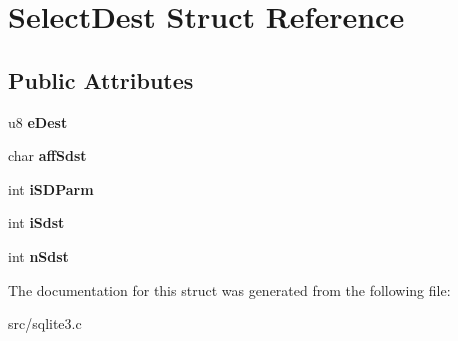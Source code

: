 \hypertarget{struct_select_dest}{\section{Select\-Dest Struct Reference}
\label{struct_select_dest}
}
\subsection*{Public Attributes}
\begin{DoxyCompactItemize}
\item 
\hypertarget{struct_select_dest_a779c1809acadd15898db0b20e31cc23f}{u8 {\bfseries e\-Dest}}\label{struct_select_dest_a779c1809acadd15898db0b20e31cc23f}

\item 
\hypertarget{struct_select_dest_a7c58e0aef1d9e1eff03a8d765e7e2395}{char {\bfseries aff\-Sdst}}\label{struct_select_dest_a7c58e0aef1d9e1eff03a8d765e7e2395}

\item 
\hypertarget{struct_select_dest_ad30d63b2b7216a533a5ea476412664aa}{int {\bfseries i\-S\-D\-Parm}}\label{struct_select_dest_ad30d63b2b7216a533a5ea476412664aa}

\item 
\hypertarget{struct_select_dest_adbc1c5f38b8c95da1d05e8c25dee400f}{int {\bfseries i\-Sdst}}\label{struct_select_dest_adbc1c5f38b8c95da1d05e8c25dee400f}

\item 
\hypertarget{struct_select_dest_aa4e7438446ef26231f7426edfda13e19}{int {\bfseries n\-Sdst}}\label{struct_select_dest_aa4e7438446ef26231f7426edfda13e19}

\end{DoxyCompactItemize}


The documentation for this struct was generated from the following file\-:\begin{DoxyCompactItemize}
\item 
src/sqlite3.\-c\end{DoxyCompactItemize}
